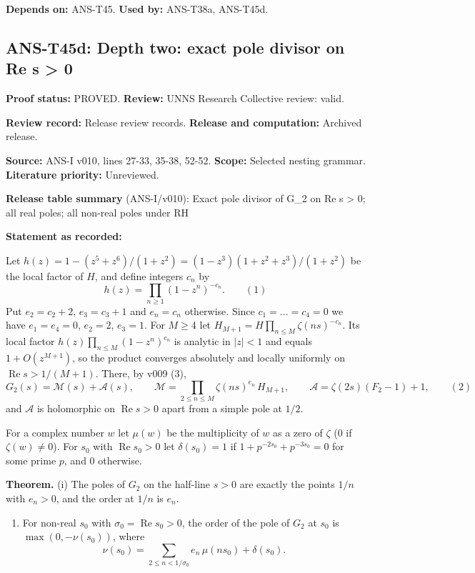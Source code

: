 \documentclass[
  11pt,
]{article}
\providecommand{\tightlist}{%
  \setlength{\itemsep}{0pt}\setlength{\parskip}{0pt}}
\begin{document}
\textbf{Depends on:} ANS-T45. \textbf{Used by:} ANS-T38a, ANS-T45d.

\hypertarget{ans-t45d-depth-two-exact-pole-divisor-on-re-s-0}{%
\subsection{ANS-T45d: Depth two: exact pole divisor on Re s
\textgreater{}
0}\label{ans-t45d-depth-two-exact-pole-divisor-on-re-s-0}}

\textbf{Proof status:} PROVED. \textbf{Review:} UNNS Research Collective
review: valid.

\textbf{Review record:} Release review records. \textbf{Release and
computation:} Archived release.

\textbf{Source:} ANS-I v010, lines 27-33, 35-38, 52-52. \textbf{Scope:}
Selected nesting grammar. \textbf{Literature priority:} Unreviewed.

\textbf{Release table summary} (ANS-I/v010): Exact pole divisor of G\_2
on Re s \textgreater{} 0; all real poles; all non-real poles under RH

\textbf{Statement as recorded:}

Let \(h(z)=1-(z^5+z^6)/(1+z^2)=(1-z^3)(1+z^2+z^3)/(1+z^2)\) be the local
factor of \(H\), and define integers \(c_n\) by
\[h(z)=\prod_{n\ge1}(1-z^n)^{-c_n}.\qquad(1)\] Put \(e_2=c_2+2\),
\(e_3=c_3+1\) and \(e_n=c_n\) otherwise. Since \(c_1=\dots=c_4=0\) we
have \(e_1=e_4=0\), \(e_2=2\), \(e_3=1\). For \(M\ge4\) let
\(H_{M+1}=H\prod_{n\le M}\zeta(ns)^{-c_n}\). Its local factor
\(h(z)\prod_{n\le M}(1-z^n)^{c_n}\) is analytic in \(|z|<1\) and equals
\(1+O(z^{M+1})\), so the product converges absolutely and locally
uniformly on \(\operatorname{Re}s>1/(M+1)\). There, by v009 (3),
\[G_2(s)=\mathcal M(s)+\mathcal A(s),\qquad\mathcal M=\prod_{2\le n\le M}\zeta(ns)^{e_n}\,H_{M+1},\qquad\mathcal A=\zeta(2s)(F_2-1)+1,\qquad(2)\]
and \(\mathcal A\) is holomorphic on \(\operatorname{Re}s>0\) apart from
a simple pole at \(1/2\).

For a complex number \(w\) let \(\mu(w)\) be the multiplicity of \(w\)
as a zero of \(\zeta\) (\(0\) if \(\zeta(w)\ne0\)). For \(s_0\) with
\(\operatorname{Re}s_0>0\) let \(\delta(s_0)=1\) if
\(1+p^{-2s_0}+p^{-3s_0}=0\) for some prime \(p\), and \(0\) otherwise.

\textbf{Theorem.} (i) The poles of \(G_2\) on the half-line \(s>0\) are
exactly the points \(1/n\) with \(e_n>0\), and the order at \(1/n\) is
\(e_n\).

\begin{enumerate}
\def\labelenumi{(\roman{enumi})}
\setcounter{enumi}{1}
\tightlist
\item
  For non-real \(s_0\) with \(\sigma_0=\operatorname{Re}s_0>0\), the
  order of the pole of \(G_2\) at \(s_0\) is \(\max(0,-\nu(s_0))\),
  where \[\nu(s_0)=\sum_{2\le n<1/\sigma_0}e_n\,\mu(ns_0)+\delta(s_0).\]
\end{enumerate}
\end{document}
